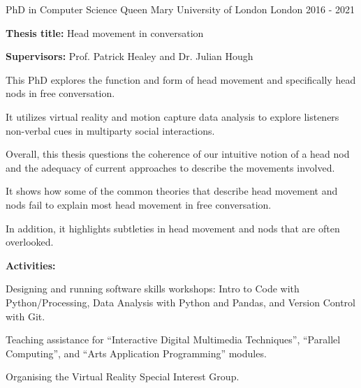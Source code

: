 \documentclass[11pt, a4paper]{awesome-cv}
\begin{document}
\begin{cventries}

  \cventry
    {PhD in Computer Science} %
    {Queen Mary University of London} %
    {London} %
    {2016 - 2021} %
    {
      \begin{cvitems} %
        \item {\textbf{Thesis title:} Head movement in conversation}
        \item {\textbf{Supervisors:} Prof. Patrick Healey and Dr. Julian Hough}
        \item {This PhD explores the function and form of head movement and specifically head nods in free conversation.}
        \item {It utilizes virtual reality and motion capture data analysis to explore listeners non-verbal cues in multiparty social interactions.}
        \item {Overall, this thesis questions the coherence of our intuitive notion of a head nod and the adequacy of current approaches to describe the movements involved.}
        \item {It shows how some of the common theories that describe head movement and nods fail to explain most head movement in free conversation.}
        \item {In addition, it highlights subtleties in head movement and nods that are often overlooked.}
        \item {\textbf{Activities:}}
        \item {Designing and running software skills workshops: Intro to Code with Python/Processing, Data Analysis with Python and Pandas, and Version Control with Git.}
        \item {Teaching assistance for ``Interactive Digital Multimedia Techniques'', ``Parallel Computing'', and ``Arts Application Programming'' modules.}
        \item {Organising the Virtual Reality Special Interest Group.}
      \end{cvitems}
    }


\end{cventries}
\end{document}
